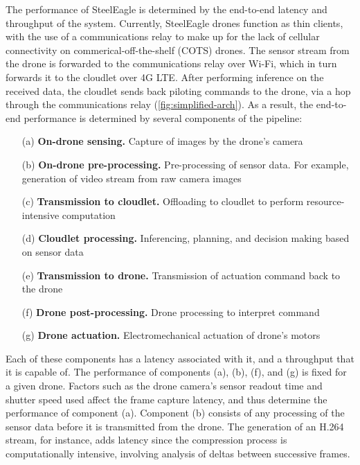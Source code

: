 The performance of SteelEagle is determined by the end-to-end latency and
throughput of the system. Currently, SteelEagle drones function as thin
clients, with the use of a communications relay to make up for the lack of
cellular connectivity on commerical-off-the-shelf (COTS) drones. The sensor
stream from the drone is forwarded to the communications relay over Wi-Fi,
which in turn forwards it to the cloudlet over 4G LTE. After performing
inference on the received data, the cloudlet sends back piloting commands to
the drone, via a hop through the communications relay
(\cref{fig:simplified-arch}). As a result, the end-to-end performance is
determined by several components of the pipeline:
\begin{enumerate}
    \item[(a)] \textbf{On-drone sensing.} Capture of images by the drone's camera
    \item[(b)] \textbf{On-drone pre-processing.} Pre-processing of sensor data.
        For example, generation of video stream from raw camera images
    \item[(c)] \textbf{Transmission to cloudlet.} Offloading to cloudlet to
        perform resource-intensive computation
    \item[(d)] \textbf{Cloudlet processing.} Inferencing, planning, and decision
        making based on sensor data
    \item[(e)] \textbf{Transmission to drone.} Transmission of actuation command
        back to the drone
    \item[(f)] \textbf{Drone post-processing.} Drone processing to interpret
        command
    \item[(g)] \textbf{Drone actuation.} Electromechanical actuation of drone's
        motors
\end{enumerate}

Each of these components has a latency associated with it, and a throughput
that it is capable of. The performance of components (a), (b), (f), and (g) is
fixed for a given drone. Factors such as the drone camera's sensor readout time
and shutter speed used affect the frame capture latency, and thus determine the
performance of component (a). Component (b) consists of any processing of the
sensor data before it is transmitted from the drone. The generation of an H.264
stream, for instance, adds latency since the compression process is
computationally intensive, involving analysis of deltas between successive
frames.

